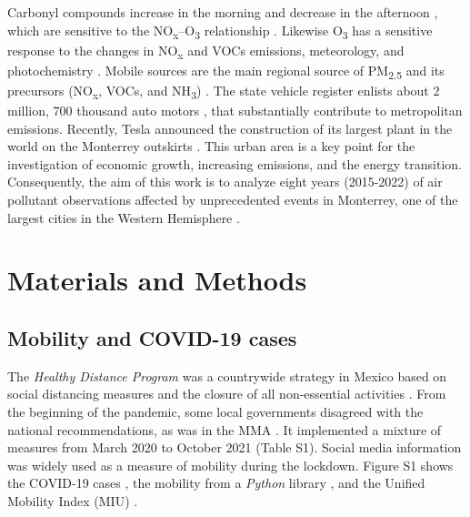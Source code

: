 \documentclass[sn-mathphys-num]{sn-jnl}
\begin{document}
Carbonyl compounds increase in the morning and decrease in the afternoon \citep{j2012}, which are sensitive to the NO\textsubscript{x}--O\textsubscript{3} relationship \citep{Menchaca_Torre_2015a}. Likewise O\textsubscript{3} has a sensitive response to the changes in NO\textsubscript{x} and VOCs emissions, meteorology, and photochemistry \citep{Hern_ndez_Paniagua_2017}. Mobile sources are the main regional source of PM\textsubscript{2.5} and its precursors (NO\textsubscript{x}, VOCs, and NH\textsubscript{3}) \citep{Martinez-Cinco2016}. The state vehicle register enlists about 2 million, 700 thousand auto motors \citep{len}, that substantially contribute to metropolitan emissions. Recently, Tesla announced the construction of its largest plant in the world on the Monterrey outskirts \citep{tesla_2023}. This urban area is a key point for the investigation of economic growth, increasing emissions, and the energy transition. Consequently, the aim of this work is to analyze eight years (2015-2022) of air pollutant observations affected by unprecedented events in Monterrey, one of the largest cities in the Western Hemisphere \citep{Ni_2023}.
\section{Materials and Methods}
\subsection{Mobility and COVID-19 cases}
The \emph{Healthy Distance Program} was a countrywide strategy in Mexico based on social distancing measures and the closure of all non-essential activities \citep{covid-19a}. From the beginning of the pandemic, some local governments disagreed with the national recommendations, as was in the MMA \citep{state}. It implemented a mixture of measures from March 2020 to October 2021 (Table S1). Social media information was widely used as a measure of mobility during the lockdown. Figure S1 shows the COVID-19 cases \citep{covid19mex}, the mobility from a \emph{Python} library \citep{Graff_2022}, and the Unified Mobility Index (MIU) \citep{conacyt}.
\end{document}
